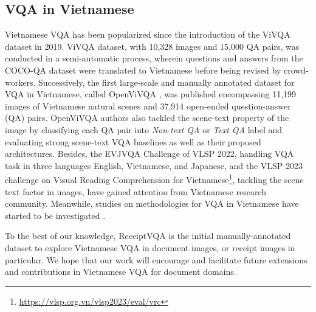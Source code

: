 
\subsection{VQA in Vietnamese} \label{sec:rel_vqavi}

Vietnamese VQA has been popularized since the introduction of the ViVQA dataset \cite{vivqa} in 2019. ViVQA dataset, with 10,328 images and 15,000 QA pairs, was conducted in a semi-automatic process, wherein questions and answers from the COCO-QA dataset \cite{cocoqa} were translated to Vietnamese before being revised by crowd-workers. Successively, the first large-scale and manually annotated dataset for VQA in Vietnamese, called OpenViVQA \cite{openvivqa}, was published encompassing 11,199 images of Vietnamese natural scenes and 37,914 open-ended question-answer (QA) pairs. OpenViVQA authors also tackled the scene-text property of the image by classifying each QA pair into \textit{Non-text QA} or \textit{Text QA} label and evaluating strong scene-text VQA baselines as well as their proposed architectures. Besides, the EVJVQA Challenge \cite{Luu_Thuy_Nguyen_2023} of VLSP 2022, handling VQA task in three languages English, Vietnamese, and Japanese, and the VLSP 2023 challenge on Visual Reading Comprehension for Vietnamese\footnote{\url{https://vlsp.org.vn/vlsp2023/eval/vrc}}, tackling the scene text factor in images, have gained attention from Vietnamese research community. Meanwhile, studies on methodologies for VQA in Vietnamese have started to be investigated \cite{phuc2020vican,nguyen2023pat,tran2023bartphobeit}.

To the best of our knowledge, ReceiptVQA is the initial manually-annotated dataset to explore Vietnamese VQA in document images, or receipt images in particular. We hope that our work will encourage and facilitate future extensions and contributions in Vietnamese VQA for document domains. 

